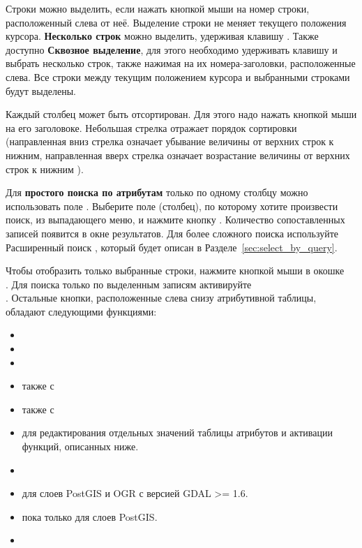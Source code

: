 Строки можно выделить, если нажать кнопкой мыши на номер строки, расположенный
слева от неё. Выделение строки не меняет текущего положения курсора.
\textbf{Несколько строк} можно выделить, удерживая клавишу .
Также доступно \textbf{Сквозное выделение}, для этого необходимо
удерживать клавишу  и выбрать несколько строк, также
нажимая на их номера-заголовки, расположенные слева. Все строки между
текущим положением курсора и выбранными строками будут выделены.

Каждый столбец может быть отсортирован. Для этого надо нажать кнопкой мыши
на его заголовоке. Небольшая стрелка отражает порядок сортировки (направленная
вниз стрелка означает убывание величины от верхних строк к нижним,
направленная вверх стрелка означает возрастание величины от верхних строк
к нижним ).

Для \textbf{простого поиска по атрибутам} только по одному столбцу можно
использовать поле . Выберите поле (столбец), по которому
хотите произвести поиск, из выпадающего меню, и нажмите кнопку .
Количество сопоставленных записей появится в окне результатов. Для более
сложного поиска используйте Расширенный поиск , который будет
описан в Разделе~\ref{sec:select_by_query}.

Чтобы отобразить только выбранные строки, нажмите кнопкой мыши в окошке \\
. Для поиска только по выделенным
записям активируйте \\
. Остальные
кнопки, расположенные слева снизу атрибутивной таблицы, обладают следующими
функциями:

\begin{itemize}[label=--]
\item {}
\item {}
\item {}
\item {}
также с 
\item {}
также с 
\item {} для
редактирования отдельных значений таблицы атрибутов и активации функций,
описанных ниже.
\item {}
\item {} для слоев PostGIS
и OGR с версией GDAL >= 1.6.
\item {} пока только для
слоев PostGIS.
\item {}
\end{itemize}

